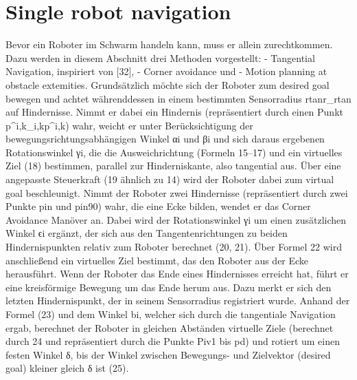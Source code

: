 \documentclass[conference]{IEEEtran}
\begin{document}
\section{Single robot navigation}
Bevor ein Roboter im Schwarm handeln kann, muss er allein zurechtkommen. Dazu werden in diesem Abschnitt drei Methoden vorgestellt:
-	Tangential Navigation, inspiriert von [32],
-	Corner avoidance und
-	Motion planning at obstacle extemities.
Grundsätzlich möchte sich der Roboter zum desired goal bewegen und achtet währenddessen in einem bestimmten Sensorradius rtanr_{}rtan auf Hindernisse. Nimmt er dabei ein Hindernis (repräsentiert durch einen Punkt p^i,k_{i,k}p^i,k) wahr, weicht er unter Berücksichtigung der bewegungsrichtungsabhängigen Winkel αi und βi und sich daraus ergebenen Rotationswinkel γi, die die Ausweichrichtung (Formeln 15–17) und ein virtuelles Ziel (18) bestimmen, parallel zur Hinderniskante, also tangential aus. Über eine angepasste Steuerkraft (19 ähnlich zu 14) wird der Roboter dabei zum virtual goal beschleunigt.
Nimmt der Roboter zwei Hindernisse (repräsentiert durch zwei Punkte pin und pin90) wahr, die eine Ecke bilden, wendet er das Corner Avoidance Manöver an. Dabei wird der Rotationswinkel γi um einen zusätzlichen Winkel ϵi ergänzt, der sich aus den Tangentenrichtungen zu beiden Hindernispunkten relativ zum Roboter berechnet (20, 21). Über Formel 22 wird anschließend ein virtuelles Ziel bestimmt, das den Roboter aus der Ecke herausführt.
Wenn der Roboter das Ende eines Hindernisses erreicht hat, führt er eine kreisförmige Bewegung um das Ende herum aus. Dazu merkt er sich den letzten Hindernispunkt, der in seinem Sensorradius registriert wurde. Anhand der Formel (23) und dem Winkel bi, welcher sich durch die tangentiale Navigation ergab, berechnet der Roboter in gleichen Abständen virtuelle Ziele (berechnet durch 24 und repräsentiert durch die Punkte Piv1 bis pd) und rotiert um einen festen Winkel δ, bis der Winkel zwischen Bewegungs- und Zielvektor (desired goal) kleiner gleich δ ist (25).
\end{document}
